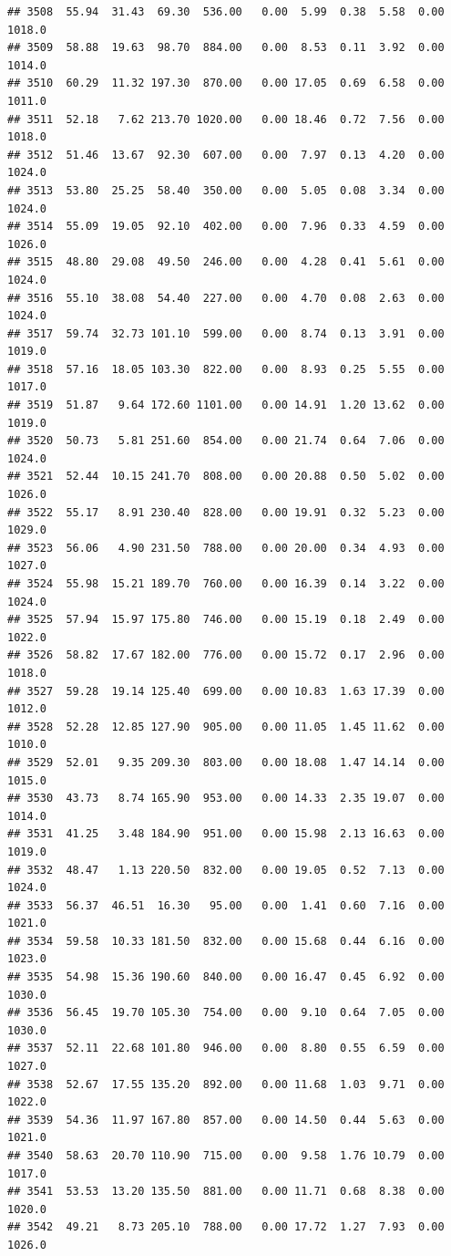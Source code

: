 \documentclass{article}\usepackage{graphicx, color}
\makeatletter
\newenvironment{kframe}{%
 \def\at@end@of@kframe{}%
 \ifinner\ifhmode%
  \def\at@end@of@kframe{\end{minipage}}%
  \begin{minipage}{\columnwidth}%
 \fi\fi%
 \def\FrameCommand##1{\hskip\@totalleftmargin \hskip-\fboxsep
 \colorbox{shadecolor}{##1}\hskip-\fboxsep
     \hskip-\linewidth \hskip-\@totalleftmargin \hskip\columnwidth}%
 \MakeFramed {\advance\hsize-\width
   \@totalleftmargin\z@ \linewidth\hsize
   \@setminipage}}%
 {\par\unskip\endMakeFramed%
 \at@end@of@kframe}
\newenvironment{knitrout}{}{} %
\makeatother
\begin{document}
\begin{knitrout}
\begin{kframe}
\begin{verbatim}
## 3508  55.94  31.43  69.30  536.00   0.00  5.99  0.38  5.58  0.00 1018.0
## 3509  58.88  19.63  98.70  884.00   0.00  8.53  0.11  3.92  0.00 1014.0
## 3510  60.29  11.32 197.30  870.00   0.00 17.05  0.69  6.58  0.00 1011.0
## 3511  52.18   7.62 213.70 1020.00   0.00 18.46  0.72  7.56  0.00 1018.0
## 3512  51.46  13.67  92.30  607.00   0.00  7.97  0.13  4.20  0.00 1024.0
## 3513  53.80  25.25  58.40  350.00   0.00  5.05  0.08  3.34  0.00 1024.0
## 3514  55.09  19.05  92.10  402.00   0.00  7.96  0.33  4.59  0.00 1026.0
## 3515  48.80  29.08  49.50  246.00   0.00  4.28  0.41  5.61  0.00 1024.0
## 3516  55.10  38.08  54.40  227.00   0.00  4.70  0.08  2.63  0.00 1024.0
## 3517  59.74  32.73 101.10  599.00   0.00  8.74  0.13  3.91  0.00 1019.0
## 3518  57.16  18.05 103.30  822.00   0.00  8.93  0.25  5.55  0.00 1017.0
## 3519  51.87   9.64 172.60 1101.00   0.00 14.91  1.20 13.62  0.00 1019.0
## 3520  50.73   5.81 251.60  854.00   0.00 21.74  0.64  7.06  0.00 1024.0
## 3521  52.44  10.15 241.70  808.00   0.00 20.88  0.50  5.02  0.00 1026.0
## 3522  55.17   8.91 230.40  828.00   0.00 19.91  0.32  5.23  0.00 1029.0
## 3523  56.06   4.90 231.50  788.00   0.00 20.00  0.34  4.93  0.00 1027.0
## 3524  55.98  15.21 189.70  760.00   0.00 16.39  0.14  3.22  0.00 1024.0
## 3525  57.94  15.97 175.80  746.00   0.00 15.19  0.18  2.49  0.00 1022.0
## 3526  58.82  17.67 182.00  776.00   0.00 15.72  0.17  2.96  0.00 1018.0
## 3527  59.28  19.14 125.40  699.00   0.00 10.83  1.63 17.39  0.00 1012.0
## 3528  52.28  12.85 127.90  905.00   0.00 11.05  1.45 11.62  0.00 1010.0
## 3529  52.01   9.35 209.30  803.00   0.00 18.08  1.47 14.14  0.00 1015.0
## 3530  43.73   8.74 165.90  953.00   0.00 14.33  2.35 19.07  0.00 1014.0
## 3531  41.25   3.48 184.90  951.00   0.00 15.98  2.13 16.63  0.00 1019.0
## 3532  48.47   1.13 220.50  832.00   0.00 19.05  0.52  7.13  0.00 1024.0
## 3533  56.37  46.51  16.30   95.00   0.00  1.41  0.60  7.16  0.00 1021.0
## 3534  59.58  10.33 181.50  832.00   0.00 15.68  0.44  6.16  0.00 1023.0
## 3535  54.98  15.36 190.60  840.00   0.00 16.47  0.45  6.92  0.00 1030.0
## 3536  56.45  19.70 105.30  754.00   0.00  9.10  0.64  7.05  0.00 1030.0
## 3537  52.11  22.68 101.80  946.00   0.00  8.80  0.55  6.59  0.00 1027.0
## 3538  52.67  17.55 135.20  892.00   0.00 11.68  1.03  9.71  0.00 1022.0
## 3539  54.36  11.97 167.80  857.00   0.00 14.50  0.44  5.63  0.00 1021.0
## 3540  58.63  20.70 110.90  715.00   0.00  9.58  1.76 10.79  0.00 1017.0
## 3541  53.53  13.20 135.50  881.00   0.00 11.71  0.68  8.38  0.00 1020.0
## 3542  49.21   8.73 205.10  788.00   0.00 17.72  1.27  7.93  0.00 1026.0

\end{verbatim}
\end{kframe}
\end{knitrout}
\end{document}
